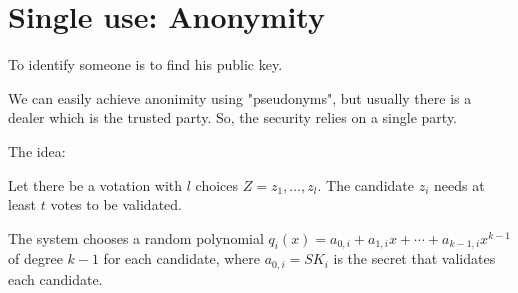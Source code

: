 \chapter{Single use: Anonymity}

To identify someone is to find his public key.

We can easily achieve anonimity using "pseudonyms", but usually there is a dealer which is the trusted party. So, the security relies on a single party.

The idea:

Let there be a votation with $l$ choices $Z ={z_1, \dots, z_l}$. The candidate $z_i$ needs at least $t$ votes to be validated.

The system chooses a random polynomial $q_i(x) = a_{0,i} + a_{1,i} x + \cdots + a_{k-1 , i}  x ^{k-1}$ of degree $k-1$ for each candidate, where $a_{0,i} = SK_i$ is the secret that validates each candidate.
